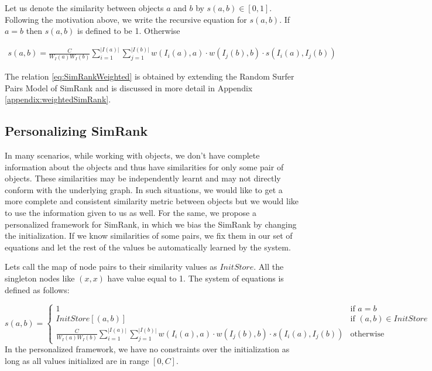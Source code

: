 Let us denote the similarity between objects $a$ and $b$ by $s(a,b) \in [0,1]$.
Following the motivation above, we write the recursive equation for $s(a,b)$.
If $a = b$ then $s(a,b)$ is defined to be 1. Otherwise 

\begin{align}
s(a,b) = \frac{C}{W_{I}(a)W_{I}(b)} \sum_{i=1}^{|I(a)|} \sum_{j=1}^{|I(b)|} w(I_i(a),a) \cdot w(I_j(b),b) \cdot s(I_i(a),I_j(b)) \label{eq:SimRankWeighted}
\end{align}

\noindent
The relation \ref{eq:SimRankWeighted} is obtained by extending the Random Surfer Pairs Model of SimRank and is discussed in more detail in Appendix \ref{appendix:weightedSimRank}.

\subsection{Personalizing SimRank}
\label{subsection:PersonalizedSimRank}
In many scenarios, while working with objects, we don't have complete information about the objects and thus have similarities for only some pair of objects. These similarities may be independently learnt and may not directly conform with the underlying graph. In such situations, we would like to get a more complete and consistent similarity metric between objects but we would like to use the information given to us as well. For the same, we propose a personalized framework for SimRank, in which we bias the SimRank by changing the initialization.
If we know similarities of some pairs, we fix them in our set of equations and let the rest of the values be automatically learned by the system.

Lets call the map of node pairs to their similarity values as $InitStore$. All the singleton nodes like $(x,x)$ have value equal to 1. The system of equations is defined as follows: 

\begin{equation} \label{eq:PersonalizedWeightedSimRank}
s(a,b) =
\left\{ \begin{array}{rl}
1 & \mbox{if } a=b\\
InitStore[(a,b)] & \mbox{if } (a,b) \in InitStore\\
\frac{C}{W_{I}(a)W_{I}(b)} \sum_{i=1}^{|I(a)|} \sum_{j=1}^{|I(b)|} w(I_i(a),a) \cdot w(I_j(b),b) \cdot s(I_i(a),I_j(b)) & \mbox{otherwise }
\end{array}\right.
\end{equation}
In the personalized framework, we have no constraints over the initialization as long as all values initialized are in range $[0,C]$. 

